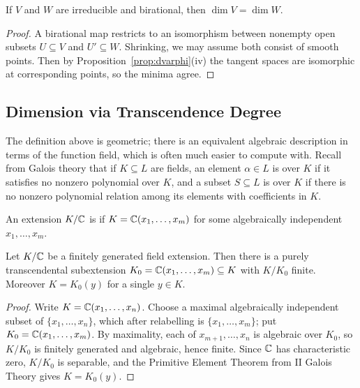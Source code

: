 \documentclass[a4paper]{scrartcl}
\begin{document}
\begin{corollary}
	If $V$ and $W$ are irreducible and birational, then $\dim V = \dim W$.
\end{corollary}

\begin{proof}
	A birational map restricts to an isomorphism between nonempty open subsets $U \subseteq V$ and $U' \subseteq W$. Shrinking, we may assume both consist of smooth points. Then by Proposition~\ref{prop:dvarphi}(iv) the tangent spaces are isomorphic at corresponding points, so the minima agree.
\end{proof}

\subsection{Dimension via Transcendence Degree}

The definition above is geometric; there is an equivalent algebraic description in terms of the function field, which is often much easier to compute with. Recall from Galois theory that if $K \subseteq L$ are fields, an element $\alpha \in L$ is  over $K$ if it satisfies no nonzero polynomial over $K$, and a subset $S \subseteq L$ is  over $K$ if there is no nonzero polynomial relation among its elements with coefficients in $K$.

\begin{definition}
	An extension $K/\mathbb{C}$ is  if $K = \mathbb{C}(x_1,\dots,x_m)$ for some algebraically independent $x_1,\dots,x_m$.
\end{definition}

\begin{proposition}\label{prop:transbasis}
	Let $K/\mathbb{C}$ be a finitely generated field extension. Then there is a purely transcendental subextension $K_0 = \mathbb{C}(x_1,\dots,x_m) \subseteq K$ with $K/K_0$ finite. Moreover $K = K_0(y)$ for a single $y \in K$.
\end{proposition}

\begin{proof}
	Write $K = \mathbb{C}(x_1,\dots,x_n)$. Choose a maximal algebraically independent subset of $\{x_1,\dots,x_n\}$, which after relabelling is $\{x_1,\dots,x_m\}$; put $K_0 = \mathbb{C}(x_1,\dots,x_m)$. By maximality, each of $x_{m+1},\dots,x_n$ is algebraic over $K_0$, so $K/K_0$ is finitely generated and algebraic, hence finite. Since $\mathbb{C}$ has characteristic zero, $K/K_0$ is separable, and the Primitive Element Theorem from II Galois Theory gives $K = K_0(y)$.
\end{proof}
\end{document}
